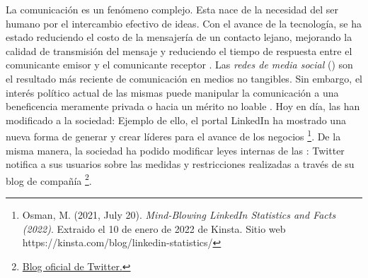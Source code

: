 \documentclass[../main.tex]{subfiles}
\begin{document}
\onehalfspacing



La comunicación es un fenómeno complejo. Esta nace de la necesidad del ser humano por el intercambio efectivo de ideas. Con el avance de la tecnología, se ha estado reduciendo el costo de la mensajería de un contacto lejano, mejorando la calidad de transmisión del mensaje y reduciendo el tiempo de respuesta entre el comunicante emisor y el comunicante receptor \cite{alhadlaq2016technology} . Las \textit{redes de media social} (\RMS) son el resultado más reciente de comunicación en medios no tangibles. Sin embargo, el interés político actual de las mismas puede manipular la comunicación a una beneficencia meramente privada o hacia un mérito no loable \cite{Chen2021}. Hoy en día, las \RMS han modificado a la sociedad: Ejemplo de ello, el portal LinkedIn ha mostrado una nueva forma de generar y crear líderes para el avance de los negocios \footnote{Osman, M. (2021, July 20). \textit{Mind-Blowing LinkedIn Statistics and Facts (2022)}. Extraido el 10 de enero de 2022 de Kinsta. Sitio web  https://kinsta.com/blog/linkedin-statistics/}. De la misma manera, la sociedad ha podido modificar leyes internas de las \RMS: Twitter notifica a sus usuarios sobre las medidas y restricciones realizadas a través de su blog de compañía \footnote{\href{https://blog.twitter.com/en\_us/topics/company.html}{Blog oficial de Twitter.} }.




\end{document}
